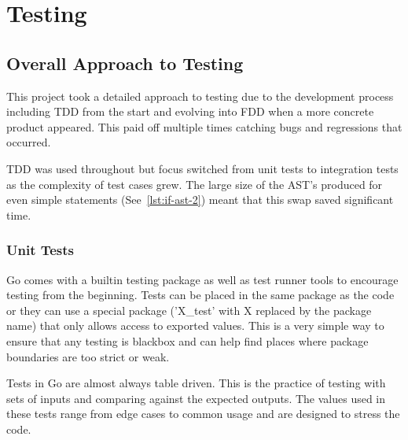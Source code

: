 \chapter{Testing}




\section{Overall Approach to Testing}
This project took a detailed approach to testing due to the development process including TDD from the start and evolving into FDD when a more concrete product appeared.
This paid off multiple times catching bugs and regressions that occurred.

TDD was used throughout but focus switched from unit tests to integration tests as the complexity of test cases grew. 
The large size of the AST's produced for even simple statements (See~\ref{lst:if-ast-2}) meant that this swap saved significant time.

\subsection{Unit Tests}
Go comes with a builtin testing package as well as test runner tools to encourage testing from the beginning.
Tests can be placed in the same package as the code or they can use a special package ('X\_test' with X replaced by the package name) that only allows access to exported values.
This is a very simple way to ensure that any testing is blackbox and can help find places where package boundaries are too strict or weak.

Tests in Go are almost always table driven.
This is the practice of testing with sets of inputs and comparing against the expected outputs.
The values used in these tests range from edge cases to common usage and are designed to stress the code.


